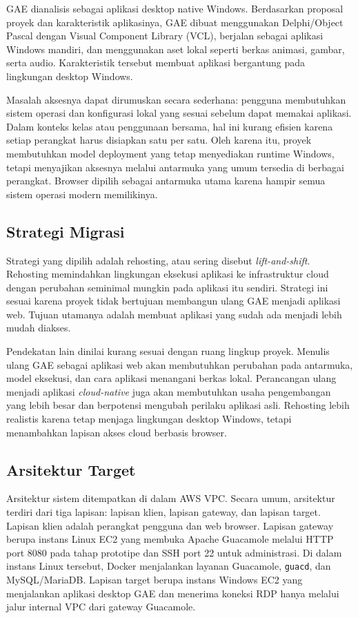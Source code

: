 \documentclass[conference]{IEEEtran}
\begin{document}
GAE dianalisis sebagai aplikasi desktop native Windows. Berdasarkan proposal proyek dan karakteristik aplikasinya, GAE dibuat menggunakan Delphi/Object Pascal dengan Visual Component Library (VCL), berjalan sebagai aplikasi Windows mandiri, dan menggunakan aset lokal seperti berkas animasi, gambar, serta audio. Karakteristik tersebut membuat aplikasi bergantung pada lingkungan desktop Windows.

Masalah aksesnya dapat dirumuskan secara sederhana: pengguna membutuhkan sistem operasi dan konfigurasi lokal yang sesuai sebelum dapat memakai aplikasi. Dalam konteks kelas atau penggunaan bersama, hal ini kurang efisien karena setiap perangkat harus disiapkan satu per satu. Oleh karena itu, proyek membutuhkan model deployment yang tetap menyediakan runtime Windows, tetapi menyajikan aksesnya melalui antarmuka yang umum tersedia di berbagai perangkat. Browser dipilih sebagai antarmuka utama karena hampir semua sistem operasi modern memilikinya.

\subsection{Strategi Migrasi}

Strategi yang dipilih adalah rehosting, atau sering disebut \textit{lift-and-shift}. Rehosting memindahkan lingkungan eksekusi aplikasi ke infrastruktur cloud dengan perubahan seminimal mungkin pada aplikasi itu sendiri. Strategi ini sesuai karena proyek tidak bertujuan membangun ulang GAE menjadi aplikasi web. Tujuan utamanya adalah membuat aplikasi yang sudah ada menjadi lebih mudah diakses.

Pendekatan lain dinilai kurang sesuai dengan ruang lingkup proyek. Menulis ulang GAE sebagai aplikasi web akan membutuhkan perubahan pada antarmuka, model eksekusi, dan cara aplikasi menangani berkas lokal. Perancangan ulang menjadi aplikasi \textit{cloud-native} juga akan membutuhkan usaha pengembangan yang lebih besar dan berpotensi mengubah perilaku aplikasi asli. Rehosting lebih realistis karena tetap menjaga lingkungan desktop Windows, tetapi menambahkan lapisan akses cloud berbasis browser.

\subsection{Arsitektur Target}

Arsitektur sistem ditempatkan di dalam AWS VPC. Secara umum, arsitektur terdiri dari tiga lapisan: lapisan klien, lapisan gateway, dan lapisan target. Lapisan klien adalah perangkat pengguna dan web browser. Lapisan gateway berupa instans Linux EC2 yang membuka Apache Guacamole melalui HTTP port 8080 pada tahap prototipe dan SSH port 22 untuk administrasi. Di dalam instans Linux tersebut, Docker menjalankan layanan Guacamole, \texttt{guacd}, dan MySQL/MariaDB. Lapisan target berupa instans Windows EC2 yang menjalankan aplikasi desktop GAE dan menerima koneksi RDP hanya melalui jalur internal VPC dari gateway Guacamole.
\end{document}
